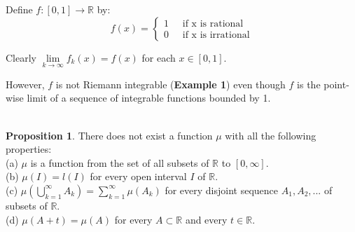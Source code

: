 \documentclass[reqno]{amsart}
\theoremstyle{definition}
\newtheorem{proposition}{Proposition}
\begin{document}
Define $f: [0, 1] \rightarrow \mathbb{R}$ by:
$$
f(x) = 
\begin{cases}
1 & \; \mbox{ if x is rational}\\
0 & \; \mbox{ if x is irrational}
\end{cases}
$$

Clearly $\lim\limits_{k \rightarrow \infty}f_{k}(x) = f(x)$ for each $x \in [0, 1]$.

However, $f$ is not Riemann integrable (\textbf{Example 1}) even though $f$ is the point-wise limit of a sequence of integrable functions bounded by 1.\\
~\\

\begin{proposition}
There does not exist a function $\mu$ with all the following properties:\\

(a) $\mu$ is a function from the set of all subsets of $\mathbb{R}$ to $[0, \infty]$.\\

(b) $\mu(I) = l(I)$ for every open interval $I$ of $\mathbb{R}$.\\

(c) $\mu\left(\bigcup\limits^{\infty}_{k=1}A_{k}\right) = \sum\limits^{\infty}_{k=1}\mu(A_{k})$ for every disjoint sequence $A_{1}, A_{2},...$ of subsets of $\mathbb{R}$.\\

(d) $\mu(A + t) = \mu(A)$ for every $A \subset \mathbb{R}$ and every $t \in \mathbb{R}$.
\end{proposition}
\end{document}
